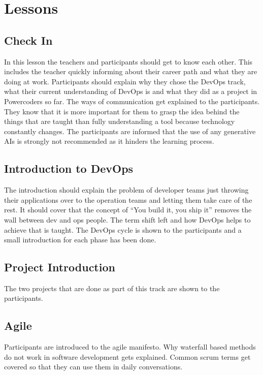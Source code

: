 \documentclass{article}
\begin{document}
\newpage

\section{Lessons}

\subsection{Check In}

In this lesson the teachers and participants should get to know each other. This
includes the teacher quickly informing about their career path and what they are
doing at work. Participants should explain why they chose the DevOps track,
what their current understanding of DevOps is and what they did as a project in
Powercoders so far. The ways of communication get explained to the participants.
They know that it is more important for them to grasp the idea behind the things
that are taught than fully understanding a tool because technology constantly
changes. The participants are informed that the use of any generative AIs is
strongly not recommended as it hinders the learning process.

\subsection{Introduction to DevOps}

The introduction should explain the problem of developer teams just throwing
their applications over to the operation teams and letting them take care of the
rest. It should cover that the concept of ``You build it, you ship it'' removes
the wall between dev and ops people. The term shift left and how DevOps helps
to achieve that is taught. The DevOps cycle is shown to the participants and a
small introduction for each phase has been done.

\subsection{Project Introduction}

The two projects that are done as part of this track are shown to the
participants.

\subsection{Agile}

Participants are introduced to the agile manifesto. Why waterfall
based methods do not work in software development gets explained. Common scrum
terms get covered so that they can use them in daily conversations.
\end{document}

